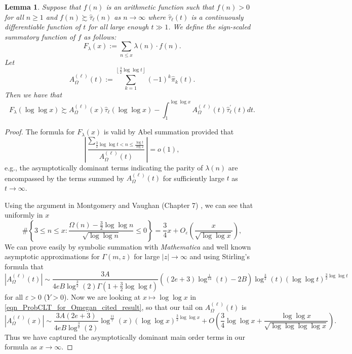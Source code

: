 \documentclass[11pt,reqno,a4letter]{article}
\numberwithin{figure}{section}
\numberwithin{table}{section}
\newcommand{\floor}[1]{\left\lfloor #1 \right\rfloor}
\theoremstyle{plain}
\newtheorem{lemma}[theorem]{Lemma}
\numberwithin{theorem}{section}
\theoremstyle{definition}
\begin{document}
\begin{lemma} 
\label{lemma_CLT_and_AbelSummation} 
Suppose that $f(n)$ is an arithmetic function such that $f(n) > 0$ for all $n \geq 1$ and 
$f(n) \succsim \widehat{\tau}_{\ell}(n)$ as $n \rightarrow \infty$ where 
$\widehat{\tau}_{\ell}(t)$ is a continuously differentiable function of $t$ for all 
large enough $t \gg 1$. 
We define the sign-scaled summatory function of $f$ as follows: 
\[
F_{\lambda}(x) := \sum_{n \leq x} \lambda(n) \cdot f(n). 
\]
Let 
\[
A_{\Omega}^{(\ell)}(t) := \sum_{k=1}^{\floor{\frac{3}{2} \log\log t}} (-1)^k \widehat{\pi}_k(t). 
\]
Then we have that 
\[
F_{\lambda}(\log\log x) \succsim A_{\Omega}^{(\ell)}(x) \widehat{\tau}_{\ell}(\log\log x) - 
     \int_1^{\log\log x} 
     A_{\Omega}^{(\ell)}(t) \widehat{\tau}_{\ell}^{\prime}(t) dt. 
\]
\end{lemma}
\begin{proof} 
The formula for $F_{\lambda}(x)$ is valid by Abel summation provided that 
\[
\left\lvert \frac{\sum\limits_{\frac{3}{2} \log\log t < n \leq \frac{\log t}{\log 2}}}{ 
     A_{\Omega}^{(\ell)}(t)}\right\rvert = o(1), 
\]
e.g., the asymptotically dominant terms indicating the parity of 
$\lambda(n)$ are encompassed by the terms summed by $A_{\Omega}^{(\ell)}(t)$ for 
sufficiently large $t$ as $t \rightarrow \infty$. 

Using the argument in Montgomery and Vaughan (Chapter 7) \cite[Thm.\ 7.21]{MV}, we can see that 
uniformly in $x$ 
\begin{equation} 
\label{eqn_ProbCLT_for_Omegan_cited_result} 
\#\left\{3 \leq n \leq x: \frac{\Omega(n) - \frac{3}{2}\log\log n}{\sqrt{\log\log n}} \leq 0\right\} = 
     \frac{3}{4}x + O_{\varepsilon}\left(\frac{x}{\sqrt{\log\log x}}\right), 
\end{equation} 
We can prove easily by symbolic summation with \emph{Mathematica} 
and well known asymptotic approximations for $\Gamma(m, z)$ for large $|z| \rightarrow \infty$ 
and using Stirling's formula that 
\[
|A_{\Omega}^{(\ell)}(t)| 
     \sim \frac{3A}{4eB \log^{\frac{3}{2}}(2) \Gamma\left(1 + \frac{3}{2}\log\log t\right)} \left( 
     (2e+3) \log^{\frac{1}{14}}(t) - 2B\right) 
     \log^{\frac{3}{2}}(t) (\log\log t)^{\frac{3}{2}\log\log t}
\] 
for all $\varepsilon > 0$ ($Y > 0$). 
Now we are looking at $x \mapsto \log\log x$ in \eqref{eqn_ProbCLT_for_Omegan_cited_result}, 
so that our tail on $A_{\Omega}^{(\ell)}(t)$ is 
\[
|A_{\Omega}^{(\ell)}(x)| \sim 
     \frac{3A(2e+3)}{4eB \log^{\frac{3}{2}}(2)} \log^{\frac{11}{7}}(x) (\log\log x)^{\frac{3}{2}\log\log x} + 
     O\left(\frac{3}{4}\log\log x + \frac{\log\log x}{\sqrt{\log\log\log\log x}}\right). 
\]
Thus we have captured the asymptotically dominant main order terms in our formula as 
$x \rightarrow \infty$. 
\end{proof} 
\end{document}
